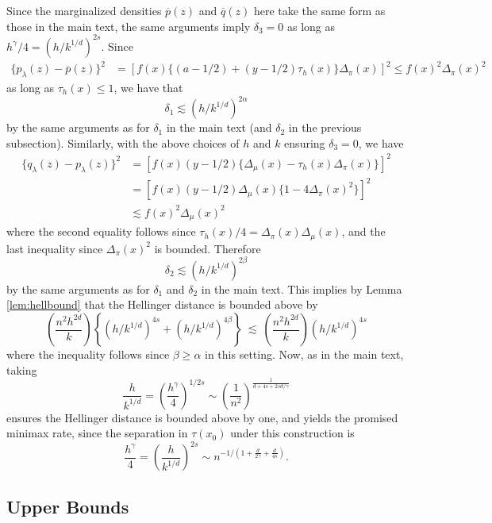 \documentclass[11pt,twoside]{article}
\theoremstyle{definition}
\theoremstyle{remark}
\begin{document}
Since the marginalized densities $\overline{p}(z)$ and $\overline{q}(z)$ here take the same form as those in the main text, the same arguments imply $\delta_3=0$ as long as $h^\gamma/4 =(h/k^{1/d})^{2s}$. 
Since
\begin{align*}
\{ p_\lambda(z) - \overline{p}(z) \}^2 &= \left[ f(x) \Big\{ (a-1/2) + (y-1/2)\tau_h(x) \Big\} \Delta_\pi(x) \right]^2 \leq f(x)^2 \Delta_\pi(x)^2
\end{align*}
as long as $\tau_h(x) \leq 1$, we have that
$$ \delta_1 \lesssim \left( h/k^{1/d} \right)^{2\alpha} $$
by the same arguments as for $\delta_1$ in the main text (and $\delta_2$ in the previous subsection). Similarly, with the above choices of $h$ and $k$ ensuring $\delta_3=0$, we have
\begin{align*}
\{ q_\lambda(z) - p_\lambda(z) \}^2 &= \left[ f(x) (y-1/2) \Big\{ \Delta_\mu(x) - \tau_h(x) \Delta_\pi(x) \Big\} \right]^2 \\
&=  \left[ f(x) (y-1/2) \Delta_\mu(x) \Big\{ 1 - 4 \Delta_\pi(x)^2 \Big\} \right]^2 \\
&\lesssim f(x)^2 \Delta_\mu(x)^2
\end{align*}
where the second equality follows since $\tau_h(x)/4=\Delta_\pi(x)\Delta_\mu(x)$, and the last inequality since $\Delta_\pi(x)^2$ is bounded. Therefore
$$ \delta_2 \lesssim  \left( h/k^{1/d} \right)^{2\beta}   $$
by the same arguments as for $\delta_1$ and $\delta_2$ in the main text. This implies by Lemma \ref{lem:hellbound} that the Hellinger distance is bounded above by
$$ \left( \frac{n^2 h^{2d}}{k} \right)  \left\{ \left( h/k^{1/d} \right)^{4s} + \left( h/k^{1/d} \right)^{4\beta}  \right\} \ \lesssim \ \left( \frac{n^2 h^{2d}}{k} \right)   \left( h/k^{1/d} \right)^{4s} $$  
where the inequality follows since $\beta \geq \alpha$ in this setting. Now, as in the main text, taking 
$$ \frac{h}{k^{1/d}} = \left( \frac{h^\gamma}{4} \right)^{1/2s} \sim \left( \frac{1}{n^2} \right)^{\frac{1}{d+ 4s+2s d/\gamma}} $$
ensures the Hellinger distance is bounded above by one, and yields the promised minimax rate, since the separation in $\tau(x_0)$ under this construction is
$$ \frac{h^\gamma}{4} = \left( \frac{h}{k^{1/d}} \right)^{2s} \sim n^{-1/\left(1 + \frac{d}{2\gamma} + \frac{d}{4 s} \right) } .  $$

\bigskip

\subsection{Upper Bounds}
\label{subsec:model2ub}
\end{document}
